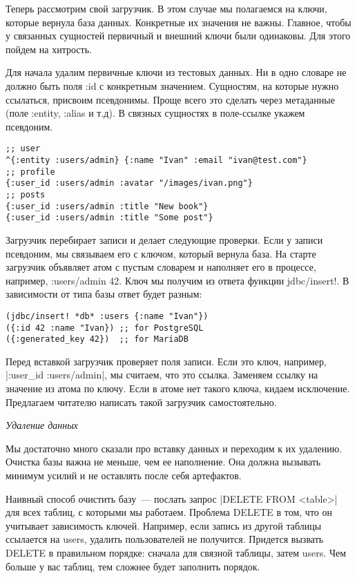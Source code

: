 Теперь рассмотрим свой загрузчик. В этом случае мы полагаемся на ключи, которые
вернула база данных. Конкретные их значения не важны. Главное, чтобы у связанных
сущностей первичный и внешний ключи были одинаковы. Для этого пойдем на
хитрость.

Для начала удалим первичные ключи из тестовых данных. Ни в одно словаре не
должно быть поля :id с конкретным значением. Сущностям, на которые нужно
ссылаться, присвоим псевдонимы. Проще всего это сделать через метаданные (поле
:entity, :alias и т.д). В связных сущностях в поле-ссылке укажем псевдоним.

\begin{verbatim}
;; user
^{:entity :users/admin} {:name "Ivan" :email "ivan@test.com"}
;; profile
{:user_id :users/admin :avatar "/images/ivan.png"}
;; posts
{:user_id :users/admin :title "New book"}
{:user_id :users/admin :title "Some post"}
\end{verbatim}

Загрузчик перебирает записи и делает следующие проверки. Если у записи
псевдоним, мы связываем его с ключом, который вернула база. На старте загрузчик
объявляет атом с пустым словарем и наполняет его в процессе, например,
{:users/admin 42}. Ключ мы получим из ответа функции jdbc/insert!. В зависимости
от типа базы ответ будет разным:

\begin{verbatim}
(jdbc/insert! *db* :users {:name "Ivan"})
({:id 42 :name "Ivan}) ;; for PostgreSQL
({:generated_key 42})  ;; for MariaDB
\end{verbatim}

Перед вставкой загрузчик проверяет поля записи. Если это ключ, например,
\spverb|{:user_id :users/admin}|, мы считаем, что это ссылка. Заменяем ссылку на значение
из атома по ключу. Если в атоме нет такого ключа, кидаем исключение. Предлагаем
читателю написать такой загрузчик самостоятельно.

\emph{Удаление данных}

Мы достаточно много сказали про вставку данных и переходим к их
удалению. Очистка базы важна не меньше, чем ее наполнение. Она должна вызывать
минимум усилий и не оставлять после себя артефактов.

Наивный способ очистить базу~--- послать запрос \spverb|DELETE FROM <table>| для всех
таблиц, с которыми мы работаем. Проблема DELETE в том, что он учитывает
зависимость ключей. Например, если запись из другой таблицы ссылается на users,
удалить пользователей не получится. Придется вызвать DELETE в правильном
порядке: сначала для связной таблицы, затем users. Чем больше у вас таблиц, тем
сложнее будет заполнить порядок.

